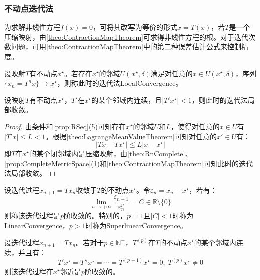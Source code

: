 \subsubsection{不动点迭代法}
\begin{method}
	为求解非线性方程$f(x)=0$，可将其改写为等价的形式$x=T(x)$，若$T$是一个压缩映射，由\cref{theo:ContractionMapTheorem}可求得非线性方程的根。对于迭代次数问题，可用\cref{theo:ContractionMapTheorem}中的第二种误差估计公式来控制精度。
\end{method}
\begin{definition}
	设映射$T$有不动点$x^{\star}$。若存在$x^{\star}$的邻域$\bar{U}(x^{\star},\delta)$满足对任意的$x\in\bar{U}(x^{\star},\delta)$，序列$\{x_n=T^nx\}\to x^{\star}$，则称此时的迭代法\gls{LocalConvergence}。
\end{definition}
\begin{theorem}\label{theo:FixedPointLocalConvergence}
	设映射$T$有不动点$x^{\star}$，$T'$在$x^{\star}$的某个邻域内连续，且$|T'x^{\star}|<1$，则此时的迭代法局部收敛。
\end{theorem}
\begin{proof}
	由条件和\cref{prop:RSeq}(5)可知存在$x^{\star}$的邻域$U$和$L$，使得对任意的$x\in U$有$|T'x|\leqslant L<1$。根据\cref{theo:LagrangeMeanValueTheorem}可知对任意的$x'\in U$有：
	\begin{equation*}
		|Tx-Tx^{\star}|\leqslant L|x-x^{\star}|
	\end{equation*}
	即$T$在$x^{\star}$的某个闭邻域内是压缩映射，由\cref{theo:RnComplete}、\cref{prop:CompleteMetricSpace}(1)和\cref{theo:ContractionMapTheorem}可知此时的迭代法局部收敛。
\end{proof}
\begin{definition}
	设迭代过程$x_{n+1}=Tx_n$收敛于$T$的不动点$x^{\star}$。令$\varepsilon_n=x_n-x^{\star}$，若有：
	\begin{equation*}
		\lim_{n\to+\infty}\frac{\varepsilon_{n+1}}{\varepsilon_n^p}=C\in\mathbb{R}\setminus\{0\}
	\end{equation*}
	则称该迭代过程是$p$阶收敛的。特别的，$p=1$且$|C|<1$时称为\gls{LinearConvergence}，$p>1$时称为\gls{SuperlinearConvergence}。
\end{definition}
\begin{theorem}\label{theo:FixedPointOrderPConvergence}
	设迭代过程$x_{n+1}=Tx_n$。若对于$p\in\mathbb{N}^+$，$T^{(p)}$在$T$的不动点$x^{\star}$的某个邻域内连续，并且有：
	\begin{equation*}
		T'x^{\star}=T''x^{\star}=\cdots=T^{(p-1)}x^{\star}=0,\;T^{(p)}x^{\star}\ne0
	\end{equation*}
	则该迭代过程在$x^{\star}$邻近是$p$阶收敛的。
\end{theorem}

